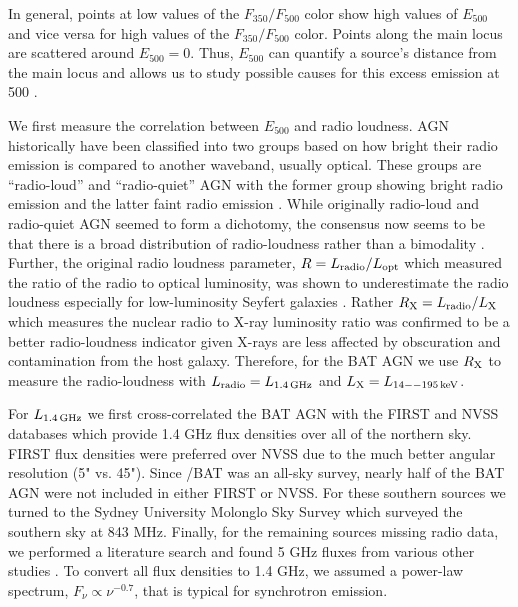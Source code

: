 In general, points at low values of the $F_{350}/F_{500}$ color show high values of $E_{500}$ and vice versa for high values of the $F_{350}/F_{500}$ color. Points along the main locus are scattered around $E_{500} = 0$. Thus, $E_{500}$ can quantify a source's distance from the main locus and allows us to study possible causes for this excess emission at 500 \um.

We first measure the correlation between $E_{500}$ and radio loudness. AGN historically have been classified into two groups based on how bright their radio emission is compared to another waveband, usually optical. These groups are ``radio-loud'' and ``radio-quiet'' AGN with the former group showing bright radio emission and the latter faint radio emission \citep{Kellermann:1989sf,Xu:1999ty}. While originally radio-loud and radio-quiet AGN seemed to form a dichotomy, the consensus now seems to be that there is a broad distribution of radio-loudness rather than a bimodality \citep{Laor:2003yg,White:2000rz,Cirasuolo:2003rm,Cirasuolo:2003zl,Laor:2003yg}. Further, the original radio loudness parameter, $R = L_{\rm radio}/L_{\rm opt}$ which measured the ratio of the radio to optical luminosity, was shown to underestimate the radio loudness especially for low-luminosity Seyfert galaxies \citep{Terashima:2003fv}. Rather $R_{\rm X} = L_{\rm radio}/L_{\rm X}$ which measures the nuclear radio to X-ray luminosity ratio was confirmed to be a better radio-loudness indicator given X-rays are less affected by obscuration and contamination from the host galaxy. Therefore, for the BAT AGN we use $R_{\rm X}$ to measure the radio-loudness with $L_{\rm radio} = L_{\rm 1.4\,GHz}$ and $L_{\rm X} = L_{\rm 14--195\,keV}$. 

For $L_{\rm 1.4\,GHz}$ we first cross-correlated the BAT AGN with the FIRST and NVSS databases which provide 1.4 GHz flux densities over all of the northern sky. FIRST flux densities were preferred over NVSS due to the much better angular resolution (5" vs. 45"). Since \swift/BAT was an all-sky survey, nearly half of the BAT AGN were not included in either FIRST or NVSS. For these southern sources we turned to the Sydney University Molonglo Sky Survey \citep[SUMSS;][]{Bock:1999fp} which surveyed the southern sky at 843 MHz. Finally, for the remaining sources missing radio data, we performed a literature search and found 5 GHz fluxes from various other studies \citep{Becker:1991qd,Griffith:1993qr,Rush:1996db,Ho:2001hl,Shi:2005rc}. To convert all flux densities to 1.4 GHz, we assumed a power-law spectrum, $F_{\nu} \propto \nu^{-0.7}$, that is typical for synchrotron emission. 
  
  